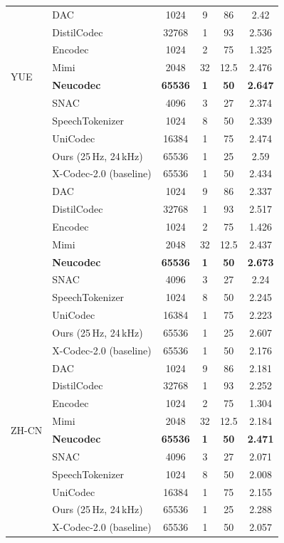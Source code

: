 \documentclass[preprint]{article}
\begin{document}
\begin{longtable}{llcccc}
\midrule
\multirow{8}{*}{YUE}
  & DAC & 1024 & 9 & 86 & 2.42 \\
  & DistilCodec & 32768 & 1 & 93 & 2.536 \\
  & Encodec & 1024 & 2 & 75 & 1.325 \\
  & Mimi & 2048 & 32 & 12.5 & 2.476 \\
  & \textbf{Neucodec} & \textbf{65536} & \textbf{1} & \textbf{50} & \textbf{2.647} \\
  & SNAC & 4096 & 3 & 27 & 2.374 \\
  & SpeechTokenizer & 1024 & 8 & 50 & 2.339 \\
  & UniCodec & 16384 & 1 & 75 & 2.474 \\
  & Ours (25\,Hz, 24\,kHz) & 65536 & 1 & 25 & 2.59 \\
  & X-Codec-2.0 (baseline) & 65536 & 1 & 50 & 2.434 \\
\newpage
\multirow{8}{*}{ZGH}
  & DAC & 1024 & 9 & 86 & 2.337 \\
  & DistilCodec & 32768 & 1 & 93 & 2.517 \\
  & Encodec & 1024 & 2 & 75 & 1.426 \\
  & Mimi & 2048 & 32 & 12.5 & 2.437 \\
  & \textbf{Neucodec} & \textbf{65536} & \textbf{1} & \textbf{50} & \textbf{2.673} \\
  & SNAC & 4096 & 3 & 27 & 2.24 \\
  & SpeechTokenizer & 1024 & 8 & 50 & 2.245 \\
  & UniCodec & 16384 & 1 & 75 & 2.223 \\
  & Ours (25\,Hz, 24\,kHz) & 65536 & 1 & 25 & 2.607 \\
  & X-Codec-2.0 (baseline) & 65536 & 1 & 50 & 2.176 \\
\midrule
\multirow{8}{*}{ZH-CN}
  & DAC & 1024 & 9 & 86 & 2.181 \\
  & DistilCodec & 32768 & 1 & 93 & 2.252 \\
  & Encodec & 1024 & 2 & 75 & 1.304 \\
  & Mimi & 2048 & 32 & 12.5 & 2.184 \\
  & \textbf{Neucodec} & \textbf{65536} & \textbf{1} & \textbf{50} & \textbf{2.471} \\
  & SNAC & 4096 & 3 & 27 & 2.071 \\
  & SpeechTokenizer & 1024 & 8 & 50 & 2.008 \\
  & UniCodec & 16384 & 1 & 75 & 2.155 \\
  & Ours (25\,Hz, 24\,kHz) & 65536 & 1 & 25 & 2.288 \\
  & X-Codec-2.0 (baseline) & 65536 & 1 & 50 & 2.057 \\

\end{longtable}
\end{document}
